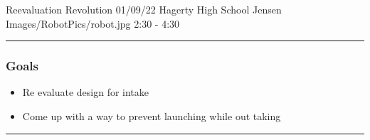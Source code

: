 \insertmeeting 
	{Reevaluation Revolution} 
	{01/09/22} 
	{Hagerty High School}
	{Jensen}
	{Images/RobotPics/robot.jpg}
	{2:30 - 4:30}
	
\noindent\hfil\rule{\textwidth}{.4pt}\hfil
\subsubsection*{Goals}
\begin{itemize}
    \item Re evaluate design for intake
    \item Come up with a way to prevent launching while out taking
 

\end{itemize} 

\noindent\hfil\rule{\textwidth}{.4pt}\hfil

